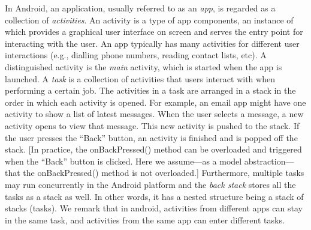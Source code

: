 
In Android, an application, usually referred to as an \emph{app}, is regarded as a collection of \emph{activities}. An activity is a type of app components, an instance of which provides a graphical user interface on screen and  serves the entry point for interacting with the user\cite{Androiddoc}. An app typically has many activities for different user interactions (e.g., dialling phone numbers, reading contact lists, etc). A distinguished activity is the \emph{main} activity, which is started when the app is launched.
%
A \emph{task} is a collection of activities that users interact with when performing a certain job.
The activities in a task are arranged in a stack %
in the order in which each activity is opened. For example, an email app might have one activity to show a list of latest messages. When the user selects a message, a new activity opens to view that message. This new activity is pushed to the stack. If the user presses the ``Back'' button, an activity is finished and is popped off the stack. [In practice, the onBackPressed() method can be overloaded and triggered when the ``Back'' button is clicked. Here we assume---as a model abstraction---that the onBackPressed() method is not overloaded.]
Furthermore, multiple tasks may run concurrently in the Android platform and the \emph{back stack} stores all the tasks as a stack as well. In other words, it has a nested structure being a stack of stacks (tasks).
%
We remark that %
in android, activities from different apps can stay in the same task, and activities from the same app can enter different tasks.

